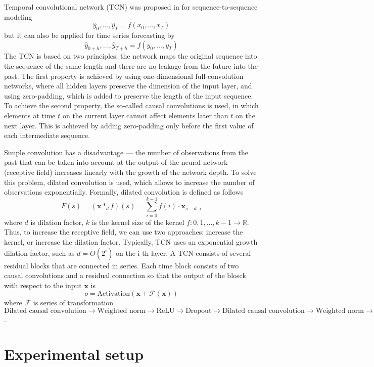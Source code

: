 \documentclass[12pt,a4paper]{article}
\begin{document}
Temporal convolutional network (TCN) was proposed in \cite{BaiTCN2018} for sequence-to-sequence modeling
$$\hat{y}_{0}, \ldots, \hat{y}_{T}=f\left(x_{0}, \ldots, x_{T}\right)$$
but it can also be applied for time series forecasting by
$$\hat{y}_{0+h}, \ldots, \hat{y}_{T+h}=f\left({y}_{0}, \ldots, {y}_{T} \right)$$
The TCN is based on two principles: the network maps the original sequence into the sequence of the same length and there are no leakage from the future into the past. The first property is achieved by using one-dimensional full-convolution networks, where all hidden layers preserve the dimension of the input layer, and using zero-padding, which is added to preserve the length of the input sequence. To achieve the second property, the so-called causal convolutions is used, in which elements at time $t$ on the current layer cannot affect elements later than $t$ on the next layer. This is achieved by adding zero-padding only before the first value of each intermediate sequence.

Simple convolution has a disadvantage — the number of observations from the past that can be taken into account at the output of the neural network (receptive field) increases linearly with the growth of the network depth. To solve this problem, dilated convolution is used, which allows to increase the number of observations exponentially. Formally, dilated convolution is defined as follows
$$F(s)=\left(\mathbf{x} *_{d} f\right)(s)=\sum_{i=0}^{k-1} f(i) \cdot \mathbf{x}_{s-d \cdot i}$$
where $d$ is dilation factor, $k$ is the kernel size of the kernel $f: {0, 1, \dots, k-1} \to \mathbb R$. Thus, to increase the receptive field, we can use two approaches: increase the kernel, or increase the dilation factor. Typically, TCN uses an exponential growth dilation factor, such as $d = O(2^i)$ on the i-th layer. 
A TCN consists of several residual blocks that are connected in series. Each time block consists of two causal convolutions and a residual connection so that the output of the blosck with respect to the input $\mathbf x$ is
$$o=\text {Activation}(\mathbf{x}+\mathcal{F}(\mathbf{x}))$$
where $\mathcal F$ is series of transformation $\text{Dilated causal convolution} \to \text{Weighted norm} \to \text{ReLU} \to \text{Dropout} \to \text{Dilated causal convolution} \to \text{Weighted norm} \to \text{ReLU} \to \text{Dropout}$.

\section{Experimental setup}
\end{document}
